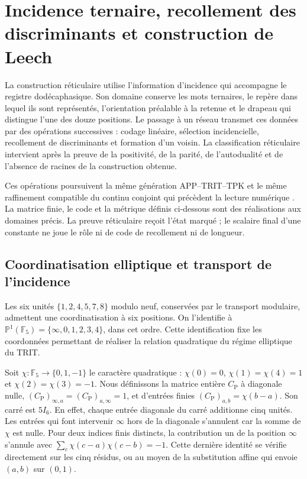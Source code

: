 \section{Incidence ternaire, recollement des discriminants et construction de Leech}
\label{sec:lf-foundations}

La construction réticulaire utilise l’information d’incidence qui
accompagne le registre dodécaphasique. Son domaine conserve les mots
ternaires, le repère dans lequel ils sont représentés, l’orientation préalable à la
retenue et le drapeau qui distingue l’une des douze positions. Le
passage à un réseau transmet ces données par des opérations
successives : codage linéaire, sélection incidencielle, recollement de
discriminants et formation d’un voisin. La classification réticulaire
intervient après la preuve de la positivité, de la parité, de l’autodualité
et de l’absence de racines de la construction obtenue.

Ces opérations poursuivent la même génération
APP--TRIT--TPK et le même raffinement compatible du continu
conjoint qui précèdent la lecture numérique \cite{HMT-IV}.
La matrice finie, le code et la métrique définis
ci-dessous sont des réalisations aux domaines précis. La preuve
réticulaire reçoit l’état marqué ; le scalaire final d’une
constante ne joue le rôle ni de code de recollement ni de longueur.

\subsection{Coordinatisation elliptique et transport de l'incidence}
\label{subsec:lf-incidence}

Les six unités \(\{1,2,4,5,7,8\}\) modulo neuf, conservées par le transport modulaire, admettent une coordinatisation à six positions. On l'identifie à \(\mathbb P^1(\mathbb F_5)=\{\infty,0,1,2,3,4\}\), dans cet ordre. Cette identification fixe les coordonnées permettant de réaliser la relation quadratique du régime elliptique du TRIT.

Soit \(\chi:\mathbb F_5\to\{0,1,-1\}\) le caractère quadratique :
\(\chi(0)=0\), \(\chi(1)=\chi(4)=1\) et
\(\chi(2)=\chi(3)=-1\). Nous définissons la matrice entière
\(C_{\mathrm P}\) à diagonale nulle,
\((C_{\mathrm P})_{\infty,a}=(C_{\mathrm P})_{a,\infty}=1\),
et d’entrées finies \((C_{\mathrm P})_{a,b}=\chi(b-a)\).
Son carré est \(5I_6\). En effet, chaque entrée diagonale du
carré additionne cinq unités. Les entrées qui font intervenir
\(\infty\) hors de la diagonale s’annulent car la somme de
\(\chi\) est nulle. Pour deux indices finis distincts, la
contribution un de la position \(\infty\) s’annule avec
\(\sum_c\chi(c-a)\chi(c-b)=-1\). Cette dernière identité se vérifie
directement sur les cinq résidus, ou au moyen de la substitution
affine qui envoie \((a,b)\) sur \((0,1)\).


